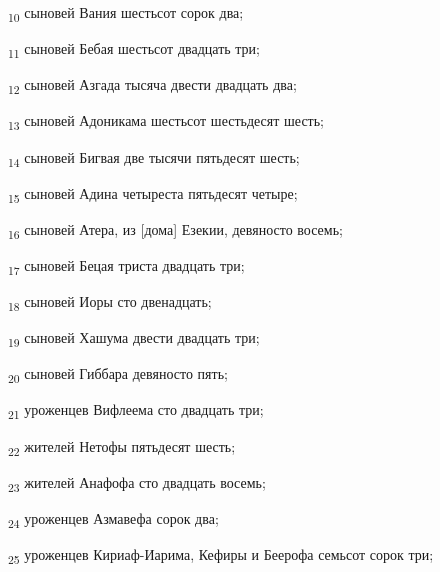 \begin{tcolorbox}
\textsubscript{10} сыновей Вания шестьсот сорок два;
\end{tcolorbox}
\begin{tcolorbox}
\textsubscript{11} сыновей Бебая шестьсот двадцать три;
\end{tcolorbox}
\begin{tcolorbox}
\textsubscript{12} сыновей Азгада тысяча двести двадцать два;
\end{tcolorbox}
\begin{tcolorbox}
\textsubscript{13} сыновей Адоникама шестьсот шестьдесят шесть;
\end{tcolorbox}
\begin{tcolorbox}
\textsubscript{14} сыновей Бигвая две тысячи пятьдесят шесть;
\end{tcolorbox}
\begin{tcolorbox}
\textsubscript{15} сыновей Адина четыреста пятьдесят четыре;
\end{tcolorbox}
\begin{tcolorbox}
\textsubscript{16} сыновей Атера, из [дома] Езекии, девяносто восемь;
\end{tcolorbox}
\begin{tcolorbox}
\textsubscript{17} сыновей Бецая триста двадцать три;
\end{tcolorbox}
\begin{tcolorbox}
\textsubscript{18} сыновей Иоры сто двенадцать;
\end{tcolorbox}
\begin{tcolorbox}
\textsubscript{19} сыновей Хашума двести двадцать три;
\end{tcolorbox}
\begin{tcolorbox}
\textsubscript{20} сыновей Гиббара девяносто пять;
\end{tcolorbox}
\begin{tcolorbox}
\textsubscript{21} уроженцев Вифлеема сто двадцать три;
\end{tcolorbox}
\begin{tcolorbox}
\textsubscript{22} жителей Нетофы пятьдесят шесть;
\end{tcolorbox}
\begin{tcolorbox}
\textsubscript{23} жителей Анафофа сто двадцать восемь;
\end{tcolorbox}
\begin{tcolorbox}
\textsubscript{24} уроженцев Азмавефа сорок два;
\end{tcolorbox}
\begin{tcolorbox}
\textsubscript{25} уроженцев Кириаф-Иарима, Кефиры и Беерофа семьсот сорок три;
\end{tcolorbox}
